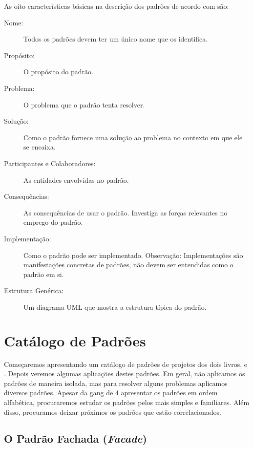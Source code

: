 \documentclass[
	11pt,				%
	openright,
	twoside,			%
	a4paper,			%
	english,			%
	french,
	brazil,				%
	sumario=tradicional
	]{abntex2}
\begin{document}
As oito características básicas na descrição dos padrões de acordo com  são:
\begin{description}
\item[Nome:] Todos os padrões devem ter um único nome que os identifica.

\item[Propósito:] O propósito do padrão.

\item[Problema:] O problema que o padrão tenta resolver.

\item[Solução:] Como o padrão fornece uma solução ao problema no contexto em que ele se encaixa.

\item[Participantes e Colaboradores:] As entidades envolvidas no padrão.

\item[Consequências:] As consequências de usar o padrão. Investiga as forças relevantes no emprego do padrão.

\item[Implementação:] Como o padrão pode ser implementado. Observação: Implementações são manifestações concretas de padrões, não devem ser entendidas como o padrão em si.

\item[Estrutura Genérica:] Um diagrama UML que mostra a estrutura típica do padrão.

\end{description}

\section{Catálogo de Padrões}

Começaremos apresentando um catálogo de padrões de projetos dos dois livros,  e . Depois veremos algumas aplicações destes padrões. Em geral, não aplicamos os padrões de maneira isolada, mas para resolver alguns problemas aplicamos diversos padrões. Apesar da gang de 4 apresentar os padrões em ordem alfabética, procuraremos estudar os padrões pelos mais simples e familiares. Além disso, procuramos deixar próximos os padrões que estão correlacionados.

\subsection{O Padrão Fachada (\textit{Facade})}
\end{document}
